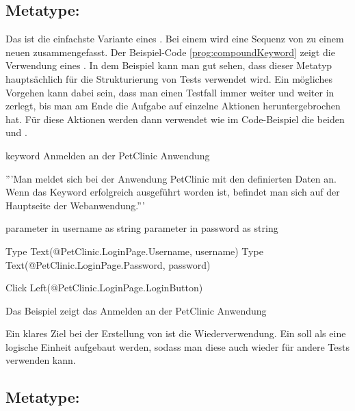 \subsection{Metatype: }

Das  ist die einfachste Variante eines . Bei einem  wird eine Sequenz von  zu einem neuen  zusammengefasst. Der Beispiel-Code \ref{prog:compoundKeyword} zeigt die Verwendung eines . In dem Beispiel kann man gut sehen, dass dieser Metatyp hauptsächlich für die Strukturierung von Tests verwendet wird. Ein mögliches Vorgehen kann dabei sein, dass man einen Testfall immer weiter und weiter in  zerlegt, bis man am Ende die Aufgabe auf einzelne Aktionen heruntergebrochen hat. Für diese Aktionen werden dann  verwendet wie im Code-Beispiel die beiden   und .

\begin{program}
\begin{JavaCode}
keyword Anmelden an der PetClinic Anwendung {
	'''Man meldet sich bei der Anwendung PetClinic mit den definierten 
	   Daten an. Wenn das Keyword erfolgreich ausgeführt worden ist, 
	   befindet man sich auf der Hauptseite der Webanwendung.'''
	
	parameter in username as string
	parameter in password as string
	
	Type Text(@PetClinic.LoginPage.Username, username)
	Type Text(@PetClinic.LoginPage.Password, password)
	
	Click Left(@PetClinic.LoginPage.LoginButton)
}
\end{JavaCode}
\caption{Das Beispiel zeigt das  Anmelden an der PetClinic Anwendung}
\label{prog:compoundKeyword}
\end{program}

\SuperPar
Ein klares Ziel bei der Erstellung von  ist die Wiederverwendung. Ein  soll als eine logische Einheit aufgebaut werden, sodass man diese auch wieder für andere Tests verwenden kann. 


\subsection{Metatype: }


